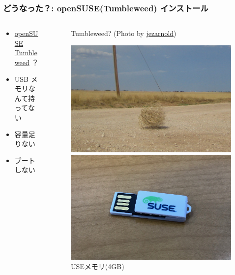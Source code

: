 \documentclass[aspectratio=169,11pt,hyperref={colorlinks=true}]{beamer}
\begin{document}
\begin{frame}
  \frametitle{どうなった？: openSUSE(Tumbleweed) インストール}
  \begin{columns}[T]
    \begin{column}{.45\textwidth}
      \begin{itemize}
        \item \href{https://www.opensuse.org/}{openSUSE} \href{https://www.opensuse.org/\#Tumbleweed}{Tumbleweed} ？
        \item USB メモリなんて持ってない
        \item 容量足りない
        \item ブートしない
      \end{itemize}
    \end{column}
    \begin{column}{0.28\textwidth}
      \begin{figure}
        \begin{center}
          \caption{Tumbleweed? (Photo by \href{https://www.flickr.com/photos/jezarnold/}{jezarnold})}
          \includegraphics[width=1.0\textwidth]{tumbleweed.jpg}
        \end{center}
        \begin{center}
          \caption{USEメモリ(4GB)}
          \includegraphics[width=1.0\textwidth]{suse_usb.jpg}

\end{center}
\end{figure}
\end{column}
\end{columns}
\end{frame}
\end{document}
